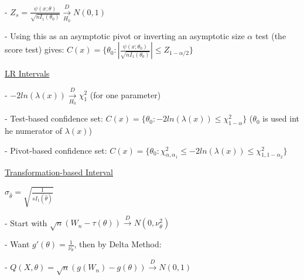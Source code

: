 \documentclass{article}
\newcommand{\dto}{\overset{D}{\to}}
\begin{document}
- $Z_s = \frac{\psi(x;\theta)}{\sqrt{n I_1(\theta_0)}} \underset{H_0}{\dto} N(0,1)$

- Using this as an asymptotic pivot or inverting an asymptotic size $\alpha$ test (the score test) gives: $C(x) = \{\theta_0: |\frac{\psi(x;\theta_0)}{\sqrt{n I_1(\theta_0)}}| \le Z_{1-\alpha/2}\}$

\underline{LR Intervals}

- $-2ln(\lambda(x)) \underset{H_0}{\dto} \chi^2_1$ (for one parameter)

- Test-based confidence set: $C(x) = \{\theta_0: -2ln(\lambda(x)) \le \chi^2_{1-\alpha}\}$ ($\theta_0$ is used int he numerator of $\lambda(x)$)

- Pivot-based confidence set: $C(x) = \{\theta_0: \chi^2_{\alpha, \alpha_1} \le -2ln(\lambda(x)) \le \chi^2_{1,1-\alpha_2}\}$

\underline{Transformation-based Interval}

$\hat{\sigma}_{\hat{\theta}} = \sqrt{\frac{1}{s I_1(\hat{\theta})}}$

- Start with $\sqrt{n}(W_n - \tau(\theta)) \dto N(0, \nu_{\theta}^2)$

- Want $g'(\theta) = \frac{1}{\nu_{\theta}}$, then by Delta Method: 

- $Q(X,\theta) = \sqrt{n}(g(W_n) - g(\theta)) \dto N(0,1)$
\end{document}
